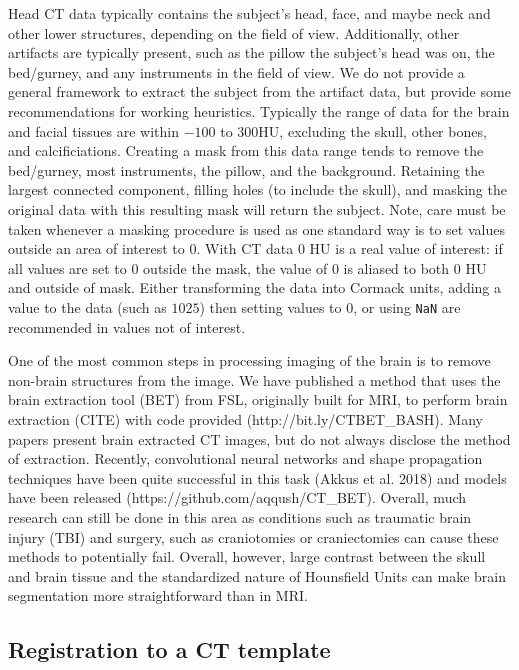 \documentclass[]{elsarticle} %
\begin{document}
Head CT data typically contains the subject's head, face, and maybe neck
and other lower structures, depending on the field of view.
Additionally, other artifacts are typically present, such as the pillow
the subject's head was on, the bed/gurney, and any instruments in the
field of view. We do not provide a general framework to extract the
subject from the artifact data, but provide some recommendations for
working heuristics. Typically the range of data for the brain and facial
tissues are within \(-100\) to \(300\)HU, excluding the skull, other
bones, and calcificiations. Creating a mask from this data range tends
to remove the bed/gurney, most instruments, the pillow, and the
background. Retaining the largest connected component, filling holes (to
include the skull), and masking the original data with this resulting
mask will return the subject. Note, care must be taken whenever a
masking procedure is used as one standard way is to set values outside
an area of interest to \(0\). With CT data \(0\) HU is a real value of
interest: if all values are set to \(0\) outside the mask, the value of
\(0\) is aliased to both \(0\) HU and outside of mask. Either
transforming the data into Cormack units, adding a value to the data
(such as \(1025\)) then setting values to \(0\), or using \texttt{NaN}
are recommended in values not of interest.

One of the most common steps in processing imaging of the brain is to
remove non-brain structures from the image. We have published a method
that uses the brain extraction tool (BET) from FSL, originally built for
MRI, to perform brain extraction (CITE) with code provided
(http://bit.ly/CTBET\_BASH). Many papers present brain extracted CT
images, but do not always disclose the method of extraction. Recently,
convolutional neural networks and shape propagation techniques have been
quite successful in this task (Akkus et al. 2018) and models have been
released (https://github.com/aqqush/CT\_BET). Overall, much research can
still be done in this area as conditions such as traumatic brain injury
(TBI) and surgery, such as craniotomies or craniectomies can cause these
methods to potentially fail. Overall, however, large contrast between
the skull and brain tissue and the standardized nature of Hounsfield
Units can make brain segmentation more straightforward than in MRI.

\hypertarget{registration-to-a-ct-template}{%
\subsection{Registration to a CT
template}\label{registration-to-a-ct-template}}
\end{document}
